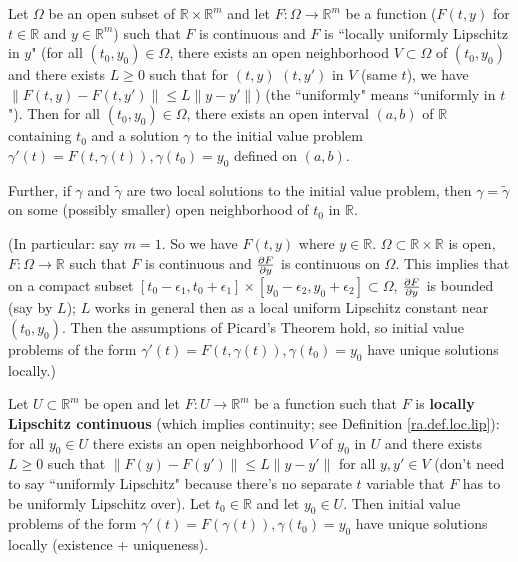 \begin{theorem}

Let \(\Omega\) be an open subset of \(\mathbb{R} \times \mathbb{R}^m\) and let \(F: \Omega \to \mathbb{R}^m\) be a function (\(F(t, y)\) for \(t \in \mathbb{R}\) and \(y \in \mathbb{R}^m\)) such that \(F\) is continuous and \(F\) is ``locally uniformly Lipschitz in \(y\)" (for all \((t_0, y_0) \in \Omega\), there exists an open neighborhood \(V \subset \Omega\) of \((t_0, y_0)\) and there exists \(L \geq 0\) such that for \((t, y)\) \((t, y')\) in \(V\) (same \(t\)), we have \(\lVert F(t,y) - F(t, y') \rVert \leq L \lVert y - y' \rVert\)) (the ``uniformly" means ``uniformly in \(t\)"). Then for all \((t_0, y_0) \in \Omega\), there exists an open interval \((a,b)\) of \(\mathbb{R}\) containing \(t_0\) and a solution \(\gamma\) to the initial value problem \(\gamma'(t) = F(t, \gamma(t)), \gamma(t_0) = y_0\) defined on \((a,b)\).

Further, if \(\gamma\) and \(\tilde{\gamma}\) are two local solutions to the initial value problem, then \(\gamma = \tilde{\gamma}\) on some (possibly smaller) open neighborhood of \(t_0\) in \(\mathbb{R}\).

(In particular: say \(m = 1\). So we have \(F(t, y)\) where \(y \in \mathbb{R}\). \(\Omega \subset \mathbb{R} \times \mathbb{R}\) is open, \(F: \Omega \to \mathbb{R}\) such that \(F\) is continuous and \(\pderiv{F}{y}\) is continuous on \(\Omega\). This implies that on a compact subset \([t_0 - \epsilon_1, t_0 + \epsilon_1] \times [y_0 - \epsilon_2, y_0 + \epsilon_2] \subset \Omega\), \(\pderiv{F}{y}\) is bounded (say by \(L\)); \(L\) works in general then as a local uniform Lipschitz constant near \((t_0, y_0)\). Then the assumptions of Picard's Theorem hold, so initial value problems of the form \(\gamma'(t) = F(t, \gamma(t)), \gamma(t_0) = y_0\) have unique solutions locally.)

\end{theorem}

\begin{theorem}\label{ra.thm.picard}

Let \(U \subset \mathbb{R}^m\) be open and let \(F: U \to \mathbb{R}^m\) be a function such that \(F\) is \textbf{locally Lipschitz continuous} (which implies continuity; see Definition \ref{ra.def.loc.lip}): for all \(y_0 \in U\) there exists an open neighborhood \(V\) of \(y_0\) in \(U\) and there exists \(L \geq 0\) such that \(\lVert F(y) - F(y') \rVert \leq L \lVert y - y' \rVert\) for all \(y, y' \in V\) (don't need to say ``uniformly Lipschitz" because there's no separate \(t\) variable that \(F\) has to be uniformly Lipschitz over). Let \(t_0 \in \mathbb{R}\) and let \(y_0 \in U\). Then initial value problems of the form \(\gamma'(t) = F(\gamma(t)), \gamma(t_0) = y_0\) have unique solutions locally (existence + uniqueness).

\end{theorem}

